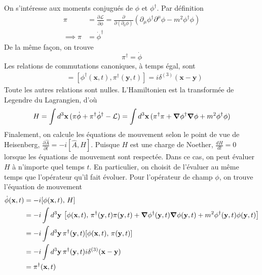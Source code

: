 \documentclass{article}
\numberwithin{equation}{section}
\begin{document}
\subsection{}
On s'intéresse aux moments conjugués de $\phi$ et $\phi^{\dagger}$. Par définition
\begin{align}
        \pi &=  \frac{\partial \mathcal{L}}{\partial \dot{\phi}} = \frac{\partial }{\partial (\partial_0 \phi)} (\partial_\mu \phi^{\dagger} \partial^{\mu} \phi - m^{2} \phi^{\dagger}\phi) \\
        \implies \pi &=  \dot{\phi}^{\dagger}
\end{align}
De la même façon, on trouve
\begin{equation}
        \pi^{\dagger} = \dot{\phi}
\end{equation} 
Les relations de commutations canoniques, à temps égal, sont
\begin{align}
        [\phi(\mathbf{x}, t), \pi(\mathbf{y}, t)] &= [\phi^{\dagger}(\mathbf{x}, t), \pi^{\dagger}(\mathbf{y}, t)] = i\delta^{(3)}(\mathbf{x} - \mathbf{y})
\end{align}
Toute les autres relations sont nulles. L'Hamiltonien est la transformée de Legendre du Lagrangien, d'où
\begin{equation}
        H = \int d^3\mathbf{x}\, (\pi \dot{\phi} + \pi^{\dagger} \dot{\phi}^{\dagger} - \mathcal{L}) = \int d^{3}\mathbf{x}\, (\pi^{\dagger}\pi + \grad \phi^{\dagger} \grad \phi + m^{2} \phi^{\dagger} \phi)
\end{equation} 
Finalement, on calcule les équations de mouvement selon le point de vue de Heisenberg, $\frac{\partial \hat{A}}{\partial t} = -i[\hat{A}, H]$. 
Puisque $H$ est une charge de Noether, $\frac{dH}{dt} = 0$ lorsque les équations de mouvement sont respectée. 
Dans ce cas, on peut évaluer $H$ à n'importe quel temps $t$. En particulier, 
on choisit de l'évaluer au même temps que l'opérateur qu'il fait évoluer. Pour l'opérateur de champ $\phi$, on trouve l'équation de mouvement 
\begin{align*}
        \dot{\phi}(\mathbf{x}, t) &= -i[\phi(\mathbf{x}, t),\, H] \\
        &= -i\int d^{3}\mathbf{y}\, 
        \left[ 
                \phi(\mathbf{x}, t),\,
                \pi^{\dagger}(\mathbf{y}, t) \pi(\mathbf{y},t)
                + \grad \phi^{\dagger}(\mathbf{y}, t) \grad \phi(\mathbf{y}, t) 
                + m^2 \phi^{\dagger}(\mathbf{y}, t) \phi(\mathbf{y}, t)
        \right] \\
        &= -i\int d^{3}\mathbf{y}\, \pi^{\dagger}(\mathbf{y}, t)[\phi(\mathbf{x}, t),\, \pi(\mathbf{y}, t)] \\
        &= -i \int d^{3}\mathbf{y}\, \pi^{\dagger}(\mathbf{y}, t) i \delta^{(3)}(\mathbf{x} - \mathbf{y}) \\
        &= \pi^{\dagger}(\mathbf{x}, t)
\end{align*}
\end{document}
